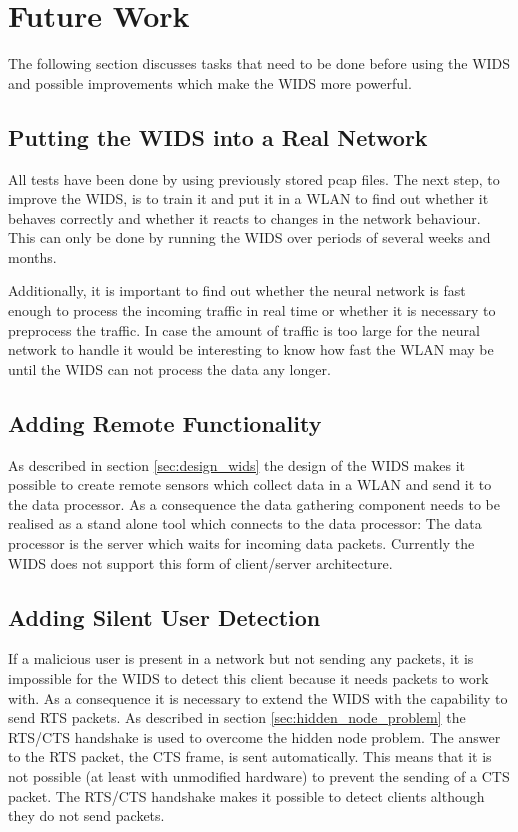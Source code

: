 \section{Future Work}

The following section discusses tasks that need to be done before using the WIDS and possible improvements which make the WIDS more powerful.

\subsection{Putting the WIDS into a Real Network}

All tests have been done by using previously stored pcap files. The next step, to improve the WIDS, is to train it and put it in a WLAN to find out whether it behaves correctly and whether it reacts to changes in the network behaviour. This can only be done by running the WIDS over periods of several weeks and months.

Additionally, it is important to find out whether the neural network is fast enough to process the incoming traffic in real time or whether it is necessary to preprocess the traffic. In case the amount of traffic is too large for the neural network to handle it would be interesting to know how fast the WLAN may be until the WIDS can not process the data any longer.

\subsection{Adding Remote Functionality}

As described in section \ref{sec:design_wids} the design of the WIDS makes it possible to create remote sensors which collect data in a WLAN and send it to the data processor. As a consequence the data gathering component needs to be realised as a stand alone tool which connects to the data processor: The data processor is the server which waits for incoming data packets. Currently the WIDS does not support this form of client/server architecture.

\subsection{Adding Silent User Detection}

If a malicious user is present in a network but not sending any packets, it is impossible for the WIDS to detect this client because it needs packets to work with. As a consequence it is necessary to extend the WIDS with the capability to send RTS packets. As described in section \ref{sec:hidden_node_problem} the RTS/CTS handshake is used to overcome the hidden node problem. The answer to the RTS packet, the CTS frame, is sent automatically. This means that it is not possible (at least with unmodified hardware) to prevent the sending of a CTS packet. The RTS/CTS handshake makes it possible to detect clients although they do not send packets.


